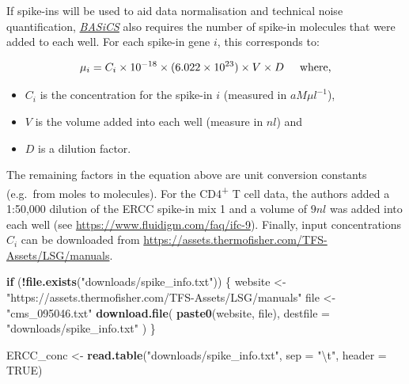 \documentclass[9pt,a4paper,]{extarticle}
\newenvironment{Shaded}{\begin{snugshade}}{\end{snugshade}}
\newcommand{\CharTok}[1]{\textcolor[rgb]{0.31,0.60,0.02}{#1}}
\newcommand{\ControlFlowTok}[1]{\textcolor[rgb]{0.13,0.29,0.53}{\textbf{#1}}}
\newcommand{\DataTypeTok}[1]{\textcolor[rgb]{0.13,0.29,0.53}{#1}}
\newcommand{\KeywordTok}[1]{\textcolor[rgb]{0.13,0.29,0.53}{\textbf{#1}}}
\newcommand{\NormalTok}[1]{#1}
\newcommand{\OperatorTok}[1]{\textcolor[rgb]{0.81,0.36,0.00}{\textbf{#1}}}
\newcommand{\OtherTok}[1]{\textcolor[rgb]{0.56,0.35,0.01}{#1}}
\newcommand{\StringTok}[1]{\textcolor[rgb]{0.31,0.60,0.02}{#1}}
\begin{document}
\begin{Shaded}
\end{Shaded}

If spike-ins will be used to aid data normalisation and technical noise
quantification, \emph{\href{https://bioconductor.org/packages/3.11/BASiCS}{BASiCS}} also requires the number of spike-in
molecules that were added to each well.
For each spike-in gene \(i\), this corresponds to:

\[ \mu_{i} = C_i \times 10^{-18} \times (6.022 \times 10^{23}) 
\times V \times D \hspace{0.5cm} \mbox{where,} \]

\begin{itemize}
\item
  \(C_i\) is the concentration for the spike-in \(i\) (measured in \(aM\mu{}l^{-1}\)),
\item
  \(V\) is the volume added into each well (measure in \(nl\)) and
\item
  \(D\) is a dilution factor.
\end{itemize}

The remaining factors in the equation above are unit conversion constants
(e.g.~from moles to molecules).
For the CD4\textsuperscript{+} T cell data, the authors added a 1:50,000 dilution of the ERCC
spike-in mix 1 and a volume of \(9nl\) was added into each well (see \url{https://www.fluidigm.com/faq/ifc-9}).
Finally, input concentrations \(C_i\) can be downloaded from
\href{https://assets.thermofisher.com/TFS-Assets/LSG/manuals/cms_095046.txt}{https://assets.thermofisher.com/TFS-Assets/LSG/manuals}.

\begin{Shaded}
\begin{Highlighting}[]
\ControlFlowTok{if}\NormalTok{ (}\OperatorTok{!}\KeywordTok{file.exists}\NormalTok{(}\StringTok{"downloads/spike_info.txt"}\NormalTok{)) \{}
\NormalTok{  website <-}\StringTok{ "https://assets.thermofisher.com/TFS-Assets/LSG/manuals"}
\NormalTok{  file <-}\StringTok{ "cms_095046.txt"}
  \KeywordTok{download.file}\NormalTok{(}
    \KeywordTok{paste0}\NormalTok{(website, file),}
    \DataTypeTok{destfile =} \StringTok{"downloads/spike_info.txt"}
\NormalTok{  )  }
\NormalTok{\}}

\NormalTok{ERCC_conc <-}\StringTok{ }\KeywordTok{read.table}\NormalTok{(}\StringTok{"downloads/spike_info.txt"}\NormalTok{, }\DataTypeTok{sep =} \StringTok{"}\CharTok{\textbackslash{}t}\StringTok{"}\NormalTok{, }\DataTypeTok{header =} \OtherTok{TRUE}\NormalTok{)}
\end{Highlighting}
\end{Shaded}
\end{document}
